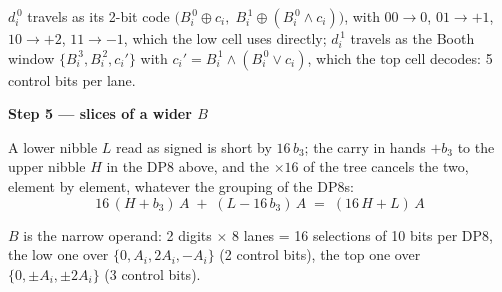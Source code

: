 \documentclass[fleqn]{article}
\begin{document}
\noindent $d_i^{\,0}$ travels as its 2-bit code
$\bigl(B_i^{\,0} \oplus c_i,\; B_i^{\,1} \oplus (B_i^{\,0} \wedge c_i)\bigr)$, with
$00 \to 0$, $01 \to +1$, $10 \to +2$, $11 \to -1$, which the low cell uses directly;
$d_i^{\,1}$ travels as the Booth window $\{B_i^{\,3}, B_i^{\,2}, c_i'\}$ with
$c_i' = B_i^{\,1} \wedge (B_i^{\,0} \vee c_i)$, which the top cell decodes: 5 control bits per lane.

\vspace{0.5em}

\noindent\textbf{Step 5 --- slices of a wider $B$}

\noindent A lower nibble $L$ read as signed is short by $16\,b_3$; the carry in hands $+b_3$ to the
upper nibble $H$ in the DP8 above, and the $\times 16$ of the tree cancels the two,
element by element, whatever the grouping of the DP8s:
\[
16\,(H + b_3)\,A \;+\; (L - 16\,b_3)\,A \;=\; (16\,H + L)\,A
\]

\vspace{0.5em}

\noindent $B$ is the narrow operand: 2 digits $\times$ 8 lanes = 16 selections of
10 bits per DP8, the low one over $\{0, A_i, 2A_i, -A_i\}$ (2 control bits), the top one
over $\{0, \pm A_i, \pm 2A_i\}$ (3 control bits).
\end{document}
